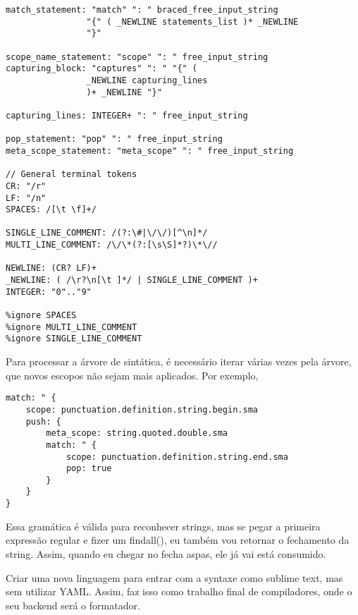 \begin{lstlisting}
match_statement: "match" ": " braced_free_input_string
                "{" ( _NEWLINE statements_list )* _NEWLINE
                "}"

scope_name_statement: "scope" ": " free_input_string
capturing_block: "captures" ": " "{" (
                _NEWLINE capturing_lines
                )+ _NEWLINE "}"

capturing_lines: INTEGER+ ": " free_input_string

pop_statement: "pop" ": " free_input_string
meta_scope_statement: "meta_scope" ": " free_input_string

// General terminal tokens
CR: "/r"
LF: "/n"
SPACES: /[\t \f]+/

SINGLE_LINE_COMMENT: /(?:\#|\/\/)[^\n]*/
MULTI_LINE_COMMENT: /\/\*(?:[\s\S]*?)\*\//

NEWLINE: (CR? LF)+
_NEWLINE: ( /\r?\n[\t ]*/ | SINGLE_LINE_COMMENT )+
INTEGER: "0".."9"

%ignore SPACES
%ignore MULTI_LINE_COMMENT
%ignore SINGLE_LINE_COMMENT
\end{lstlisting}


Para processar a árvore de sintática, é necessário iterar várias vezes pela árvore, que novos escopos não sejam mais aplicados.
Por exemplo,
\begin{lstlisting}
match: " {
    scope: punctuation.definition.string.begin.sma
    push: {
        meta_scope: string.quoted.double.sma
        match: " {
            scope: punctuation.definition.string.end.sma
            pop: true
        }
    }
}
\end{lstlisting}
Essa gramática é válida para reconhecer strings, mas se pegar a primeira expressão
regular e fizer um findall(), eu também vou retornar o fechamento da string.
Assim, quando eu chegar no fecha aspas, ele já vai está consumido.

Criar uma nova linguagem para entrar com a syntaxe como sublime text, mas sem utilizar YAML.
Assim, faz isso como trabalho final de compiladores, onde o seu backend será o formatador.


